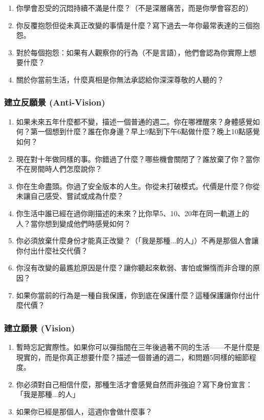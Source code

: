 \documentclass[12pt,a4paper]{article}
\begin{document}
\begin{enumerate}
    \item 你學會忍受的沉悶持續不滿是什麼？（不是深層痛苦，而是你學會容忍的）
    \item 你反覆抱怨但從未真正改變的事情是什麼？寫下過去一年你最常表達的三個抱怨。
    \item 對於每個抱怨：如果有人觀察你的行為（不是言語），他們會認為你實際上想要什麼？
    \item 關於你當前生活，什麼真相是你無法承認給你深深尊敬的人聽的？
\end{enumerate}

\subsubsection{建立反願景 (Anti-Vision)}

\begin{enumerate}
    \item 如果未來五年什麼都不變，描述一個普通的週二。你在哪裡醒來？身體感覺如何？第一個想到什麼？誰在你身邊？早上9點到下午6點做什麼？晚上10點感覺如何？
    \item 現在對十年做同樣的事。你錯過了什麼？哪些機會關閉了？誰放棄了你？當你不在房間時人們怎麼說你？
    \item 你在生命盡頭。你過了安全版本的人生。你從未打破模式。代價是什麼？你從未讓自己感受、嘗試或成為什麼？
    \item 你生活中誰已經在過你剛描述的未來？比你早5、10、20年在同一軌道上的人？當你想到變成他們時感覺如何？
    \item 你必須放棄什麼身份才能真正改變？（「我是那種...的人」）不再是那個人會讓你付出什麼社交代價？
    \item 你沒有改變的最尷尬原因是什麼？讓你聽起來軟弱、害怕或懶惰而非合理的原因？
    \item 如果你當前的行為是一種自我保護，你到底在保護什麼？這種保護讓你付出什麼代價？
\end{enumerate}

\subsubsection{建立願景 (Vision)}

\begin{enumerate}
    \item 暫時忘記實際性。如果你可以彈指間在三年後過著不同的生活——不是什麼是現實的，而是你真正想要什麼？描述一個普通的週二，和問題5同樣的細節程度。
    \item 你必須對自己相信什麼，那種生活才會感覺自然而非強迫？寫下身份宣言：「我是那種...的人」
    \item 如果你已經是那個人，這週你會做什麼事？
\end{enumerate}
\end{document}
